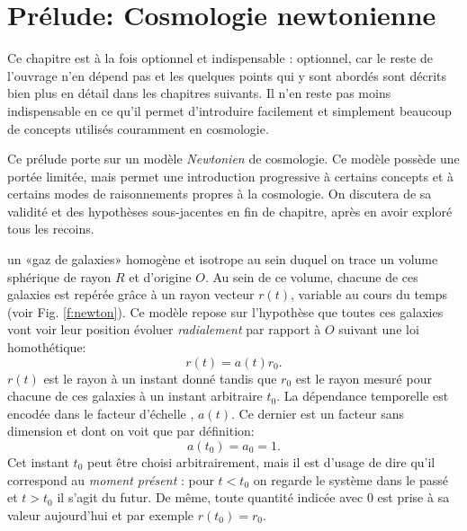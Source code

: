 \chapter{Prélude: Cosmologie newtonienne}

Ce chapitre est à la fois optionnel et indispensable : optionnel, car le reste de l'ouvrage n'en dépend pas et les quelques points qui y sont abordés sont décrits bien plus en détail dans les chapitres suivants. Il n'en reste pas moins indispensable en ce qu'il permet d'introduire facilement et simplement beaucoup de concepts utilisés couramment en cosmologie.

Ce prélude porte sur un modèle \textit{Newtonien} de cosmologie. Ce modèle possède une portée limitée, mais permet une introduction progressive à certains concepts et à certains modes de raisonnements propres à la cosmologie. On discutera de sa validité et des hypothèses sous-jacentes en fin de chapitre, après en avoir exploré tous les recoins.

 un «gaz de galaxies»  homogène et isotrope au sein duquel on trace un volume sphérique de rayon $R$ et d'origine $O$. Au sein de ce volume, chacune de ces galaxies est repérée grâce à un rayon vecteur $r(t)$, variable au cours du temps (voir Fig. \ref{f:newton}). Ce modèle repose sur l'hypothèse que toutes ces galaxies vont voir leur position évoluer \textit{radialement} par rapport à $O$ suivant une loi homothétique:
\begin{equation}
r(t)=a(t)r_0.
\end{equation}
$r(t)$ est le rayon à un instant donné tandis que $r_0$ est le rayon mesuré pour chacune de ces galaxies à un instant arbitraire $t_0$. La dépendance temporelle est encodée dans le facteur d'échelle , $a(t)$. Ce dernier est un facteur sans dimension et dont on voit que par définition:
\begin{equation}
a(t_0)=a_0=1.
\end{equation}
Cet instant $t_0$ peut être choisi arbitrairement, mais il est d'usage de dire qu'il correspond au \textit{moment présent} : pour $t<t_0$ on regarde le système dans le passé et $t>t_0$ il s'agit du futur. De même, toute quantité indicée avec $0$ est prise à sa valeur aujourd'hui et par exemple $r(t_0)=r_0$.

